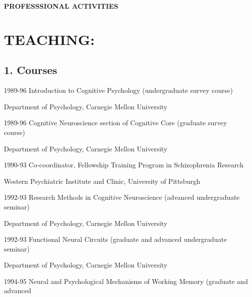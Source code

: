 \documentclass[10 pt]{article}
\begin{document}
    \newpage


    \begin{center}
{\fontsize{15pt}{16 pt}\selectfont \textbf{PROFESSSIONAL ACTIVITIES}}
    \end{center}

\section*{TEACHING:} \label{secTEACHING}
    \smallskip

\subsection*{1. Courses} \label{secTEACHING1}
    \medskip

1989-96 \hspace{0.3in} Introduction to Cognitive Psychology (undergraduate survey course)

\hspace{0.81in} Department of Psychology, Carnegie Mellon University
    \smallskip

1989-96 \hspace{0.3in} Cognitive Neuroscience section of Cognitive Core (graduate survey course)

\hspace{0.81in} Department of Psychology, Carnegie Mellon University
    \smallskip

1990-93 \hspace{0.3in} Co-coordinator, Fellowship Training Program in Schizophrenia Research

\hspace{0.81in} Western Psychiatric Institute and Clinic, University of Pittsburgh
    \smallskip

1992-93 \hspace{0.3in} Research Methods in Cognitive Neuroscience (advanced undergraduate seminar)

\hspace{0.81in} Department of Psychology, Carnegie Mellon University
    \smallskip

1992-93 \hspace{0.3in} Functional Neural Circuits (graduate and advanced undergraduate seminar)

\hspace{0.81in} Department of Psychology, Carnegie Mellon University
    \smallskip

1994-95 \hspace{0.3in} Neural and Psychological Mechanisms of Working Memory (graduate and advanced
\end{document}

